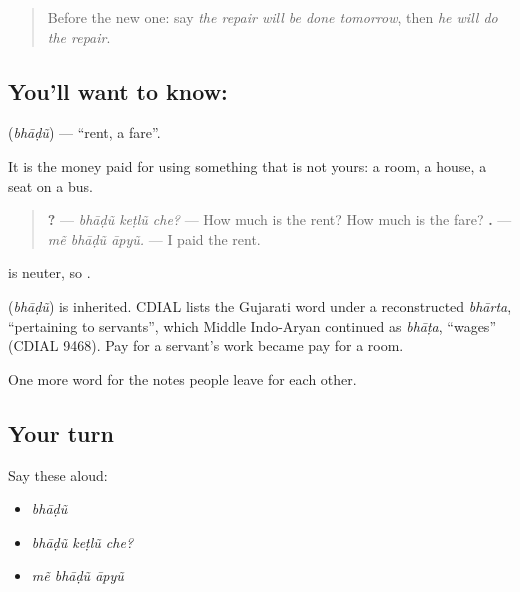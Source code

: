 \label{lesson:GU-C152-bhadun}



\begin{quote}
Before the new one: say \emph{the repair will be done tomorrow}, then \emph{he will do the repair}.
\end{quote}

\subsection*{You'll want to know: }
\textbf{} (\emph{bhāḍũ}) — \textquotedblleft{}rent, a fare\textquotedblright{}.

It is the money paid for using something that is not yours: a room, a house, a seat on a bus.

\begin{quote}
\textbf{  ?} — \emph{bhāḍũ keṭlũ che?} — How much is the rent? How much is the fare? \textbf{  .} — \emph{mẽ bhāḍũ āpyũ.} — I paid the rent.
\end{quote}

\textbf{} is neuter, so \textbf{}.

\begin{cousinweb}
\textbf{} (\emph{bhāḍũ}) is inherited. CDIAL lists the Gujarati word under a reconstructed \emph{bhārta}, \textquotedblleft{}pertaining to servants\textquotedblright{}, which Middle Indo-Aryan continued as \emph{bhāṭa}, \textquotedblleft{}wages\textquotedblright{} (CDIAL 9468). Pay for a servant's work became pay for a room.
\end{cousinweb}

\begin{grammarlens}[title={What you've built}]
One more word for the notes people leave for each other.
\end{grammarlens}

\subsection*{Your turn}
Say these aloud:

\begin{itemize}
\raggedright
  \item \emph{bhāḍũ}
  \item \emph{bhāḍũ keṭlũ che?}
  \item \emph{mẽ bhāḍũ āpyũ}
\end{itemize}


